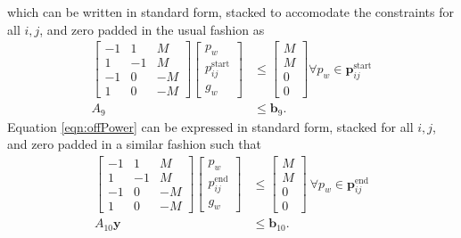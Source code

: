 which can be written in standard form, stacked to accomodate the constraints for all $i,j$, and zero padded in the usual fashion as
\begin{equation}\begin{aligned} 
	\begin{bmatrix}
		-1 & 1 & M \\
		1  & -1 & M \\
		-1 & 0 & -M \\
		1 & 0 & -M 
	\end{bmatrix}
	\begin{bmatrix} 
		p_w                     \\
	        p_{ij}^{\text{start}} \\
		g_w
	\end{bmatrix}  &\le
	\begin{bmatrix}
		M \\
		M \\
		0 \\
		0
	\end{bmatrix} \forall p_w \in \mathbf{p}_{ij}^{\text{start}}\\ 
	A_9 &\le \mathbf{b}_9.
\end{aligned}\end{equation}
	Equation \eqref{eqn:offPower} can be expressed in standard form, stacked for all $i,j$, and zero padded in a similar fashion such that 
\begin{equation}\begin{aligned} 
	\begin{bmatrix}
		-1 & 1 & M  \\
		1  & -1 & M \\
		-1 & 0 & -M \\
		1 & 0 & -M 
	\end{bmatrix}	
	\begin{bmatrix} p_w                      \\
		        p_{ij}^{\text{end}} \\
			g_w
	\end{bmatrix} &\le
	\begin{bmatrix} M \\
	                M \\
	                0 \\
	                0
	\end{bmatrix} \ \forall p_w \in \mathbf{p}_{ij}^{\text{end}} \\
	A_{10}\mathbf{y} & \le \mathbf{b}_{10}.
\end{aligned}\end{equation} 
